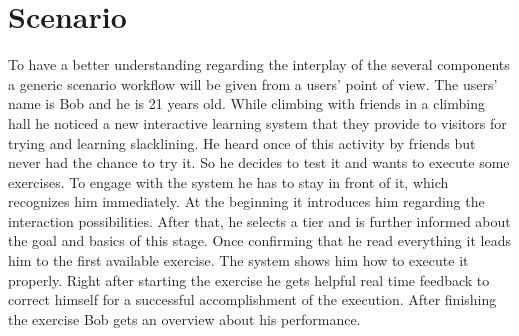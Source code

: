 \section{Scenario}\label{4_6_scenario}
To have a better understanding regarding the interplay of the several components a generic scenario workflow will be given from a users' point of view. The users' name is Bob and he is 21 years old. While climbing with friends in a climbing hall he noticed a new interactive learning system that they provide to visitors for trying and learning slacklining. He heard once of this activity by friends but never had the chance to try it. So he decides to test it and wants to execute some exercises. To engage with the system he has to stay in front of it, which recognizes him immediately. At the beginning it introduces him regarding the interaction possibilities. After that, he selects a tier and is further informed about the goal and basics of this stage. Once confirming that he read everything it leads him to the first available exercise. The system shows him how to execute it properly. Right after starting the exercise he gets helpful real time feedback to correct himself for a successful accomplishment of the execution. After finishing the exercise Bob gets an overview about his performance.


